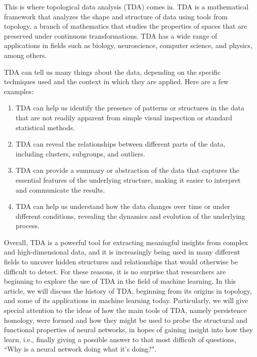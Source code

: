 \documentclass{IEEEcsmag}
\begin{document}
  This is where topological data analysis (TDA) comes in. TDA is a mathematical framework that
  analyzes the shape and structure of data using tools from topology, a branch of mathematics
  that studies the properties of spaces that are preserved under continuous transformations.
  TDA has a wide range of applications in fields such as biology, neuroscience, computer science,
  and physics, among others.

  TDA can tell us many things about the data, depending on the specific techniques used and the context in 
  which they are applied. Here are a few examples:

  \begin{enumerate}
      \item TDA can help us identify the presence of patterns or structures in the data that are not readily 
      apparent from simple visual inspection or standard statistical methods.
      \item TDA can reveal the relationships between different parts of the data, including clusters, 
      subgroups, and outliers.
      \item TDA can provide a summary or abstraction of the data that captures the essential features of the 
      underlying structure, making it easier to interpret and communicate the results.
      \item TDA can help us understand how the data changes over time or under different conditions, 
      revealing the dynamics and evolution of the underlying process.
  \end{enumerate}

Overall, TDA is a powerful tool for extracting meaningful insights from complex and high-dimensional data, 
and it is increasingly being used in many different fields to uncover hidden structures and relationships 
that would otherwise be difficult to detect. For these reasons, it is no surprise that researchers are 
beginning to explore the use of TDA in the field of machine learning. In this article, we will discuss the
history of TDA, beginning from its origins in topology, and some of its applications in machine learning today.
Particularly, we will give special attention to the ideas of how the main tools of TDA, namely persistence homology,
were formed and how they might be used to probe the structural and functional properties of neural networks, in hopes 
of gaining insight into how they learn, i.e., finally giving a possible answer to that most difficult of questions,
``Why is a neural network doing what it's doing?".
\end{document}
